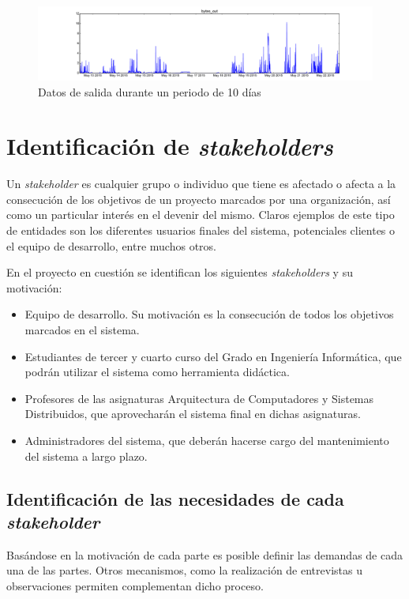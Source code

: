 \begin{figure}[H]
\centering
\includegraphics[width=\textwidth]{Chapters/Chapter4/Figures/data/bytes_out-2015-05-12_11:56:26-2015-05-22_12:56:12}
\caption{Datos de salida durante un periodo de 10 días}
\end{figure}

\section{Identificación de \textit{stakeholders}}

Un \textit{stakeholder} es cualquier grupo o individuo que tiene es afectado o afecta a la consecución de los objetivos de un proyecto marcados por una organización, así como un particular interés en el devenir del mismo. Claros ejemplos de este tipo de entidades son los diferentes usuarios finales del sistema, potenciales clientes o el equipo de desarrollo, entre muchos otros.

En el proyecto en cuestión se identifican los siguientes \textit{stakeholders} y su motivación:

\begin{itemize}
  \item Equipo de desarrollo. Su motivación es la consecución de todos los objetivos marcados en el sistema.
  \item Estudiantes de tercer y cuarto curso del Grado en Ingeniería Informática, que podrán utilizar el sistema como herramienta didáctica.
  \item Profesores de las asignaturas Arquitectura de Computadores y Sistemas Distribuidos, que aprovecharán el sistema final en dichas asignaturas.
  \item Administradores del sistema, que deberán hacerse cargo del mantenimiento del sistema a largo plazo.
\end{itemize}

\subsection{Identificación de las necesidades de cada \textit{stakeholder}}

Basándose en la motivación de cada parte es posible definir las demandas de cada una de las partes. Otros mecanismos, como la realización de entrevistas u observaciones permiten complementan dicho proceso.

